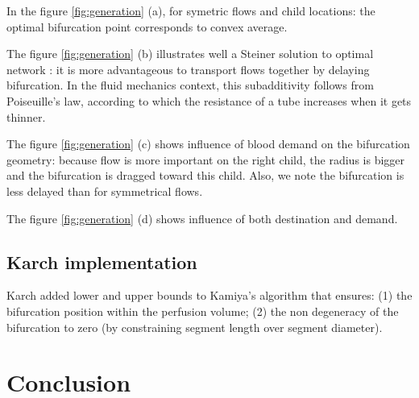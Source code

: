 \documentclass[a4paper, 11pt]{article} %
\begin{document}
In the figure \ref{fig:generation} (a), for symetric flows and child locations: the optimal bifurcation point corresponds to convex average.

The figure \ref{fig:generation} (b) illustrates well a Steiner solution to optimal network \cite{bernot2009optimal}: it is more advantageous to transport flows together by delaying bifurcation. In the fluid mechanics context, this subadditivity follows from Poiseuille's law, according to which the resistance of a tube increases when it gets thinner.

The figure \ref{fig:generation} (c) shows influence of blood demand on the bifurcation geometry: because flow is more important on the right child, the radius is bigger and the bifurcation is dragged toward this child. Also, we note the bifurcation is less delayed than for symmetrical flows.

The figure \ref{fig:generation} (d) shows influence of both destination and demand.


\subsection*{Karch implementation}

Karch added lower and upper bounds to Kamiya's algorithm that ensures:
(1) the bifurcation position within the perfusion volume; (2)
the non degeneracy of the bifurcation to zero (by constraining segment length over segment diameter).



\section*{Conclusion}
\end{document}
